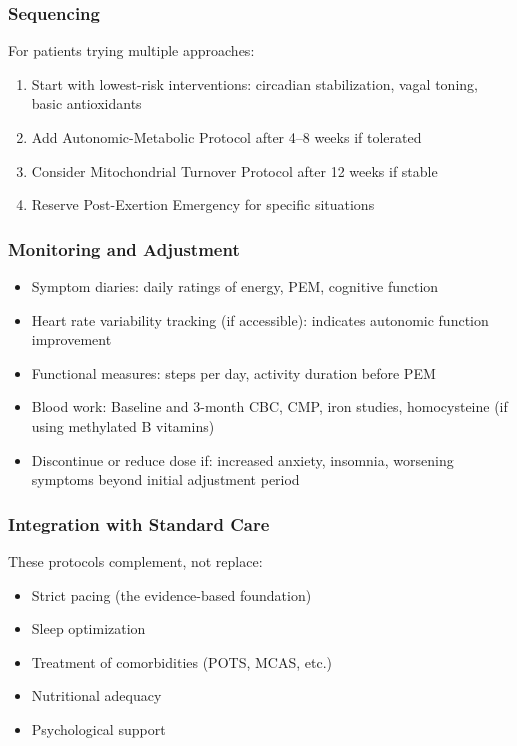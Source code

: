 \subsubsection{Sequencing}

For patients trying multiple approaches:
\begin{enumerate}
    \item Start with lowest-risk interventions: circadian stabilization, vagal toning, basic antioxidants
    \item Add Autonomic-Metabolic Protocol after 4--8 weeks if tolerated
    \item Consider Mitochondrial Turnover Protocol after 12 weeks if stable
    \item Reserve Post-Exertion Emergency for specific situations
\end{enumerate}

\subsubsection{Monitoring and Adjustment}

\begin{itemize}
    \item Symptom diaries: daily ratings of energy, PEM, cognitive function
    \item Heart rate variability tracking (if accessible): indicates autonomic function improvement
    \item Functional measures: steps per day, activity duration before PEM
    \item Blood work: Baseline and 3-month CBC, CMP, iron studies, homocysteine (if using methylated B vitamins)
    \item Discontinue or reduce dose if: increased anxiety, insomnia, worsening symptoms beyond initial adjustment period
\end{itemize}

\subsubsection{Integration with Standard Care}

These protocols complement, not replace:
\begin{itemize}
    \item Strict pacing (the evidence-based foundation)
    \item Sleep optimization
    \item Treatment of comorbidities (POTS, MCAS, etc.)
    \item Nutritional adequacy
    \item Psychological support
\end{itemize}

